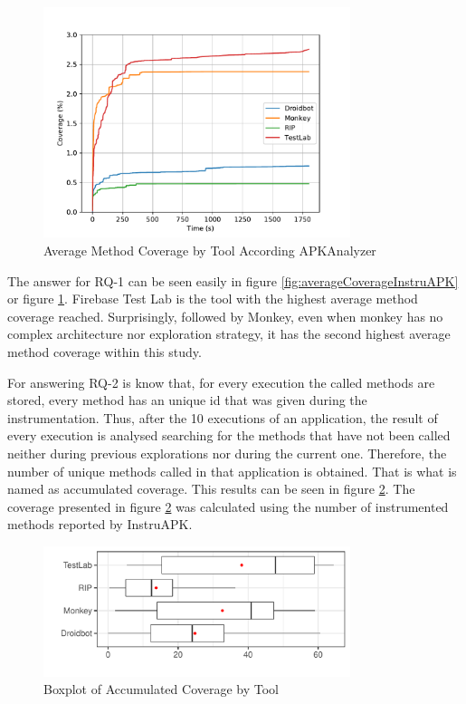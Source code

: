 \begin{figure}[h]
\centering
\includegraphics[width=0.8\textwidth]{../Figures/averageCoverageAPKAnalyzer.pdf}
\caption{Average Method Coverage by Tool According APKAnalyzer}\label{fig:averageCoverageAPKAnalyzer}
\end{figure}

The answer for RQ-1 can be seen easily in figure \ref{fig:averageCoverageInstruAPK} or figure \ref{fig:averageCoverageAPKAnalyzer}. Firebase Test Lab is the tool with the highest average method coverage reached. Surprisingly, followed by Monkey, even when monkey has no complex architecture nor exploration strategy, it has the second highest average method coverage within this study.

For answering RQ-2 is know that, for every execution the called methods are stored, every method has an unique id that was given during the instrumentation. Thus, after the 10 executions of an application, the result of every execution is analysed searching for the methods that have not been called neither during previous explorations nor during the current one. Therefore, the number of unique methods called in that application is obtained. That is what is named as accumulated coverage. This results can be seen in figure \ref{fig:boxplotAccumulated}. The coverage presented in figure \ref{fig:boxplotAccumulated} was calculated using the number of instrumented methods reported by InstruAPK. 

\begin{figure}[h]
\centering
\includegraphics[width=0.8\textwidth]{../Figures/boxplotAccumulated.pdf}
\caption{Boxplot of Accumulated Coverage by Tool}\label{fig:boxplotAccumulated}
\end{figure}

